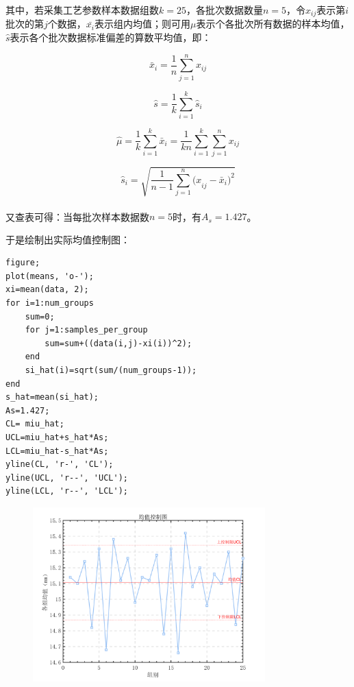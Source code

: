 \documentclass[12pt]{article}  %
\newcommand{\upcite}[1]{\textsuperscript{\textsuperscript{\cite{#1}}}}
\begin{document}
其中，若采集工艺参数样本数据组数$k=25$，各批次数据数量$n=5$，令$x_{ij}$表示第$i$批次的第$j$个数据，$\bar{x_i}$表示组内均值；则可用$\mu$表示个各批次所有数据的样本均值，$\hat{s}$表示各个批次数据标准偏差的算数平均值，即：

\begin{equation}
	{\bar{x}}_i=\frac{1}{n}\sum_{j=1}^{n}x_{ij}
\end{equation}

\begin{equation}
	\hat{s}=\frac{1}{k}\sum_{i=1}^{k}{\hat{s}}_i
\end{equation}

\begin{equation}
\hat{\mu}=\frac{1}{k}\sum_{i=1}^{k}{\bar{x}}_i=\frac{1}{kn}\sum_{i=1}^{k}\sum_{j=1}^{n}x_{ij}
\end{equation}

\begin{equation}
	{\hat{s}}_i=\sqrt{\frac{1}{n-1}\sum_{j=1}^{n}{{(x}_{ij}-{\bar{x}}_i)}^2}
\end{equation}

又查表\upcite{2}可得：当每批次样本数据数$n=5$时，有$A_s=1.427$。

于是绘制出实际均值控制图：

\begin{lstlisting}
figure;
plot(means, 'o-');
xi=mean(data, 2);
for i=1:num_groups
	sum=0;
	for j=1:samples_per_group
		sum=sum+((data(i,j)-xi(i))^2);   
	end
	si_hat(i)=sqrt(sum/(num_groups-1));
end
s_hat=mean(si_hat);
As=1.427;
CL= miu_hat;
UCL=miu_hat+s_hat*As;
LCL=miu_hat-s_hat*As;
yline(CL, 'r-', 'CL');
yline(UCL, 'r--', 'UCL');
yline(LCL, 'r--', 'LCL');
\end{lstlisting}

\begin{figure}[H]
	\centering
	\includegraphics[width=0.8\textwidth]{3.png}
\end{figure}
\end{document}

